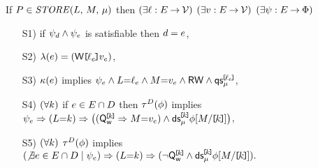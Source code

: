 \noindent
If $\aPS \in \sSTORE[\amode]{\cExp}{\aExp}$ then
$(\exists\cVal:\aEvs\fun\Val)$
$(\exists\aVal:\aEvs\fun\Val)$
$(\exists\bForm:\aEvs\fun\Formulae)$
\begin{enumerate}
\item[S1)] if $\bForm_\bEv\land\bForm_\aEv$ is satisfiable then $\bEv=\aEv$,
\item[S2)] $\labelingAct(\aEv) = \DWREFP{\cVal_\aEv}{\aVal_\aEv}$,
\item[S3)] 
  $\labelingForm(\aEv)$ implies
  \begin{math}
    \bForm_\aEv
    \land \cExp{=}\cVal_\aEv
    \land \aExp{=}\aVal_\aEv
    \land \RW
    \land \QS{\REF{\cVal_\aEv}}{\amode}
  \end{math},
\item[S4)]
  \begin{math}
    (\forall\dVal)
  \end{math}
  if
  $\aEv\in\aEvs\cap\bEvs$
  then
  $\aTr[\bEvs](\aForm)$ implies 
  \begin{math}
    \bForm_\aEv
    \limplies (\cExp{=}\dVal)
    \limplies \PBRbig{
      (\QwREF{\dVal} \limplies \aExp{=}\aVal_\aEv)
      \land \DS{\REF{\dVal}}{\amode}{\aForm[\aExp/\REF{\dVal}]}
    }
  \end{math},
\item[S5)] %
  \begin{math}
    (\forall\dVal)
  \end{math}
  $\aTr[\bEvs](\aForm)$ implies 
  \begin{math}
    (\not\exists\aEv\in\aEvs\cap\bEvs \suchthat \bForm_\aEv)
    \limplies (\cExp{=}\dVal)
    \limplies \PBR{
      \lnot\QwREF{\dVal}
      \land \DS{\REF{\dVal}}{\amode}{\aForm[\aExp/\REF{\dVal}]}
    }.
  \end{math}
\end{enumerate}

